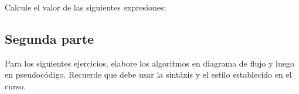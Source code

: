 \documentclass[spanish,addpoints,answers,a4paper]{exam}
\begin{document}
\begin{questions}
\begin{multicols}{3}
\end{multicols}
\question Calcule el valor de las siguientes expresiones:
\begin{multicols}{2}
\end{multicols}

\begin{solution}

\end{solution}

\end{questions}

\subsection*{Segunda parte}

Para los siguientes ejercicios, elabore los algoritmos en diagrama de flujo y luego en pseudocódigo. Recuerde que debe usar la sintáxis y el estilo establecido en el curso.
\end{document}
